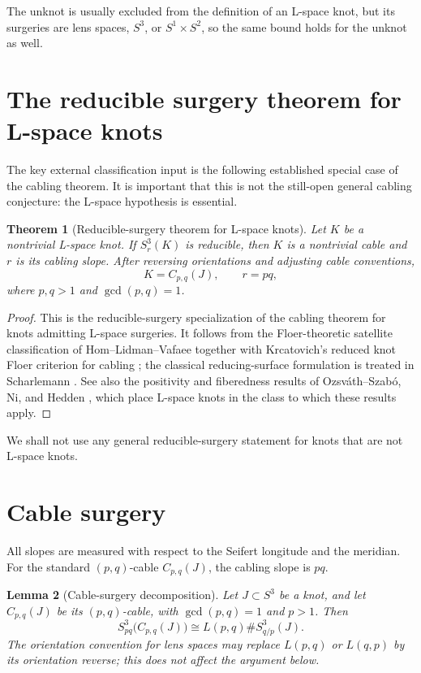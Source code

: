 \documentclass[11pt]{article}
\newtheorem{theorem}{Theorem}[section]
\newtheorem{lemma}[theorem]{Lemma}
\theoremstyle{definition}
\theoremstyle{remark}
\begin{document}
The unknot is usually excluded from the definition of an L-space knot,
but its surgeries are lens spaces, \(S^3\), or \(S^1\times S^2\), so
the same bound holds for the unknot as well.

\section{The reducible surgery theorem for L-space knots}

The key external classification input is the following established
special case of the cabling theorem.  It is important that this is not
the still-open general cabling conjecture: the L-space hypothesis is
essential.

\begin{theorem}[Reducible-surgery theorem for L-space knots]
\label{thm:red-lspace}
Let \(K\) be a nontrivial L-space knot.  If \(S^3_r(K)\) is
reducible, then \(K\) is a nontrivial cable and \(r\) is its cabling
slope.  After reversing orientations and adjusting cable conventions,
\[
K=C_{p,q}(J),\qquad r=pq,
\]
where \(p,q>1\) and \(\gcd(p,q)=1\).
\end{theorem}

\begin{proof}
This is the reducible-surgery specialization of the cabling theorem
for knots admitting L-space surgeries.  It follows from the
Floer-theoretic satellite classification of Hom--Lidman--Vafaee
\cite{HLV14} together with Krcatovich's reduced knot Floer criterion
for cabling \cite{Krc15}; the classical reducing-surface formulation
is treated in Scharlemann \cite{Scharlemann90}.  See also the
positivity and fiberedness results of Ozsv\'ath--Szab\'o, Ni, and
Hedden \cite{OS05,Ni07,Hed10}, which place L-space knots in the
class to which these results apply.
\end{proof}

We shall not use any general reducible-surgery statement for knots
that are not L-space knots.

\section{Cable surgery}

All slopes are measured with respect to the Seifert longitude and the
meridian.  For the standard \((p,q)\)-cable \(C_{p,q}(J)\), the cabling
slope is \(pq\).

\begin{lemma}[Cable-surgery decomposition]\label{lem:cable}
Let \(J\subset S^3\) be a knot, and let \(C_{p,q}(J)\) be its
\((p,q)\)-cable, with \(\gcd(p,q)=1\) and \(p>1\).  Then
\[
S^3_{pq}\bigl(C_{p,q}(J)\bigr)
\cong
L(p,q)\# S^3_{q/p}(J).
\]
The orientation convention for lens spaces may replace \(L(p,q)\) or
\(L(q,p)\) by its orientation reverse; this does not affect the
argument below.
\end{lemma}
\end{document}
